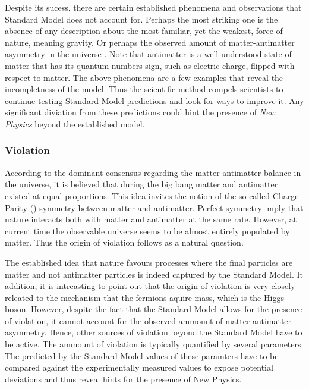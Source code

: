 Despite its sucess, there are certain established phenomena and observations that Standard
Model does not account for. Perhaps the most striking one is the absence of any description about the most familiar,
yet the weakest, force of nature, meaning gravity. Or perhaps the observed amount of matter-antimatter
asymmetry in the universe \cite{more-cpv-huet,more-cpv-gavela_I,more-cpv-gavela_II}.
Note that antimatter is a well understood state of matter that has its quantum numbers sign,
such as electric charge, flipped with respect to matter. The above phenomena are a few
examples that reveal the incompletness of the model. Thus the scientific method compels
scientists to continue testing Standard Model predictions and look for ways to improve it.
Any significant diviation from these predictions could hint the presence of
{\it New Physics} beyond the established model.

\subsubsection{\CP Violation}
According to the dominant consensus regarding the matter-antimatter balance in the
universe, it is believed that during the big bang matter and antimatter existed at
equal proportions. This idea invites the notion of the so called Charge-Parity (\CP)
symmetry between matter and antimatter. Perfect \CP symmetry imply that nature
interacts both with matter and antimatter at the same rate.
However, at current time the observable universe seems to be almost entirely populated by
matter. Thus the origin of \CP violation follows as a natural question.

The established idea that nature favours processes where the final particles are matter
and not antimatter particles is indeed captured by the Standard Model. It addition, it
is intreasting to point out that the origin of \CP violation is very closely releated
to the mechanism that the fermions aquire mass, which is the Higgs boson. However,
despite the fact that the Standard Model allows for the presence of \CP violation,
it cannot account for the observed ammount of matter-antimatter asymmetry.
Hence, other sources of \CP violation beyond the Standard Model have to be active.
The ammount of \CP violation is typically quantified by several parameters.
The predicted by the Standard Model values of these paramters have to be compared
against the experimentally measured values to expose potential deviations and thus
reveal hints for the presence of New Physics.

